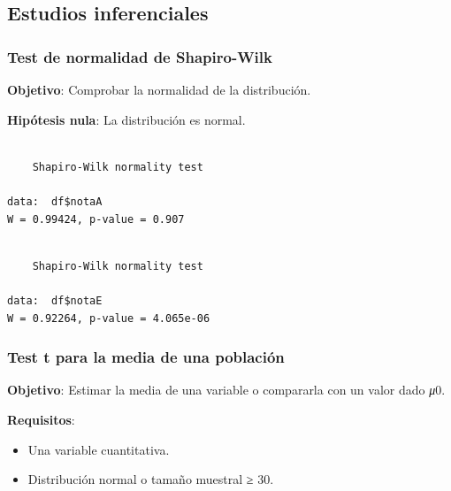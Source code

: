 \documentclass[
  a4paper,
]{scrreport}
\newenvironment{Shaded}{\begin{snugshade}}{\end{snugshade}}
\newcommand{\FunctionTok}[1]{\textcolor[rgb]{0.28,0.35,0.67}{#1}}
\newcommand{\NormalTok}[1]{\textcolor[rgb]{0.00,0.23,0.31}{#1}}
\newcommand{\SpecialCharTok}[1]{\textcolor[rgb]{0.37,0.37,0.37}{#1}}
\providecommand{\tightlist}{%
  \setlength{\itemsep}{0pt}\setlength{\parskip}{0pt}}\usepackage{longtable,booktabs,array}
\theoremstyle{definition}
\theoremstyle{definition}
\theoremstyle{remark}
\begin{document}
\subsection{Estudios inferenciales}\label{estudios-inferenciales}

\subsubsection{Test de normalidad de
Shapiro-Wilk}\label{test-de-normalidad-de-shapiro-wilk}

\textbf{Objetivo}: Comprobar la normalidad de la distribución.

\textbf{Hipótesis nula}: La distribución es normal.

\begin{Shaded}
\end{Shaded}

\begin{verbatim}

    Shapiro-Wilk normality test

data:  df$notaA
W = 0.99424, p-value = 0.907
\end{verbatim}

\begin{Shaded}
\end{Shaded}

\begin{verbatim}

    Shapiro-Wilk normality test

data:  df$notaE
W = 0.92264, p-value = 4.065e-06
\end{verbatim}

\subsubsection{Test t para la media de una
población}\label{test-t-para-la-media-de-una-poblaciuxf3n}

\textbf{Objetivo}: Estimar la media de una variable o compararla con un
valor dado \emph{μ}0.

\textbf{Requisitos}:

\begin{itemize}
\tightlist
\item
  Una variable cuantitativa.
\item
  Distribución normal o tamaño muestral ≥ 30.
\end{itemize}
\end{document}
